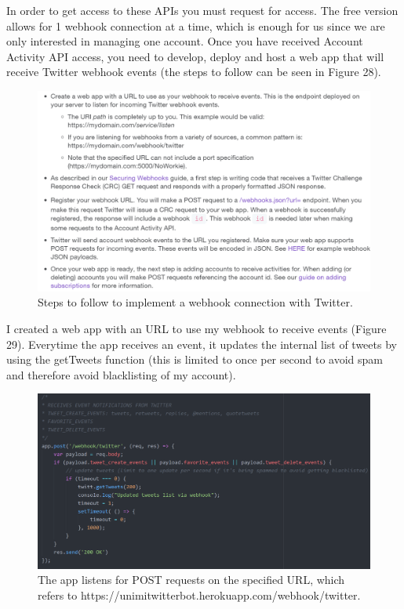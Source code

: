\documentclass[12pt]{article} %
\begin{document}
\begin{enumerate}
		In order to get access to these APIs you must request for access. The free version allows for 1 webhook connection at a time, which is enough for us since
		we are only interested in managing one account. Once you have received Account Activity API access, you need to develop, deploy and host a web app 
		that will receive Twitter webhook events (the steps to follow can be seen in Figure 28).

		\begin{figure}[H] %
		\includegraphics[width=1\linewidth]{images/accountActivitySteps}
		\caption{Steps to follow to implement a webhook connection with Twitter.}
		\label{accountActivitySteps}
		\end{figure}

		I created a web app with an URL to use my webhook to receive events (Figure 29). Everytime the app receives an event, it updates the internal list of tweets by using the 				getTweets function (this is limited to once per second to avoid spam and therefore avoid blacklisting of my account).

		\begin{figure}[H] %
		\includegraphics[width=1\linewidth]{images/webhookPOST}
		\caption{The app listens for POST requests on the specified URL, which refers to https://unimitwitterbot.herokuapp.com/webhook/twitter.}
		\label{webhookPOST}
		\end{figure}


\end{enumerate}
\end{document}
